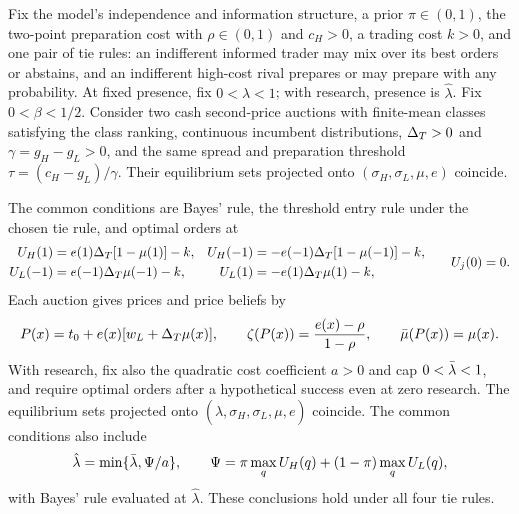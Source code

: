 \begin{lemma}\label{lem:reduction}
Fix the model's independence and information structure, a prior \(\pi\in(0,1)\), the two-point preparation cost
with \(\rho\in(0,1)\) and \(c_H>0\), a trading cost \(k>0\), and one pair of tie rules: an indifferent informed trader
may mix over its best orders or abstains, and an indifferent high-cost rival prepares or may prepare with
any probability. At fixed presence, fix \(0<\lambda<1\); with research, presence is \(\hat\lambda\).
Fix \(0<\beta<1/2\). Consider two cash second-price auctions with finite-mean classes satisfying the class
ranking, continuous incumbent distributions, \(\Delta_T>0\) and \(\gamma=g_H-g_L>0\), and the same spread and preparation threshold
\(\tau=(c_H-g_L)/\gamma\). Their equilibrium sets projected onto
\((\sigma_H,\sigma_L,\mu,e)\) coincide.

The common conditions are Bayes' rule, the threshold entry rule under the chosen tie rule, and optimal orders at
\[
\begin{aligned}
U_H(1)&=e(1)\Delta_T[1-\mu(1)]-k,& U_H(-1)&=-e(-1)\Delta_T[1-\mu(-1)]-k,\\
U_L(-1)&=e(-1)\Delta_T\mu(-1)-k,& U_L(1)&=-e(1)\Delta_T\mu(1)-k,
\end{aligned}
\qquad U_j(0)=0.
\]
Each auction gives prices and price beliefs by
\[
P(x)=t_0+e(x)[w_L+\Delta_T\mu(x)],\qquad
\zeta(P(x))=\frac{e(x)-\rho}{1-\rho},\qquad \bar\mu(P(x))=\mu(x).
\]
With research, fix also the quadratic cost coefficient \(a>0\) and cap \(0<\bar\lambda<1\), and require optimal orders
after a hypothetical success even at zero research. The equilibrium sets projected onto
\((\hat\lambda,\sigma_H,\sigma_L,\mu,e)\) coincide. The common conditions also include
\[
\hat\lambda=\min\{\bar\lambda,\Psi/a\},\qquad
\Psi=\pi\max_q U_H(q)+(1-\pi)\max_q U_L(q),
\]
with Bayes' rule evaluated at \(\hat\lambda\). These conclusions hold under all four tie rules.
\end{lemma}

